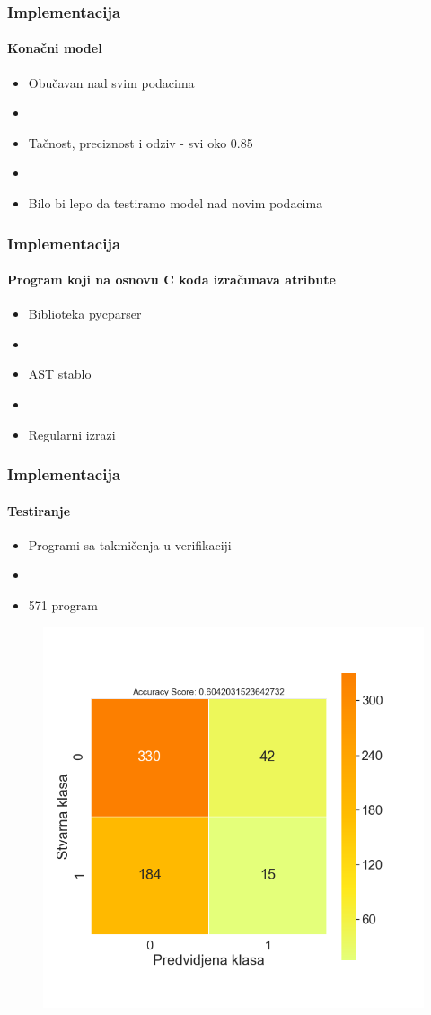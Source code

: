 \documentclass[14pt]{beamer}
\begin{document}
\begin{frame}
\frametitle{Implementacija}
\framesubtitle{Konačni model}

\begin{itemize}
\item Obučavan nad svim podacima
\item[]
\item Tačnost, preciznost i odziv - svi oko 0.85
\item[]
\item Bilo bi lepo da testiramo model nad novim podacima
\end{itemize}

\end{frame}

\begin{frame}
\frametitle{Implementacija}
\framesubtitle{Program koji na osnovu C koda izračunava atribute}

\begin{itemize}
\item Biblioteka pycparser 
\item[]
\item AST stablo
\item[]
\item Regularni izrazi
\end{itemize}

\end{frame}

\begin{frame}
\frametitle{Implementacija}
\framesubtitle{Testiranje}


\begin{itemize}
\item Programi sa takmičenja u verifikaciji
\item[]
\item 571 program

\end{itemize}

\begin{figure}
\includegraphics[width=0.5\linewidth]{confm}
\end{figure}


\end{frame}
\end{document}
